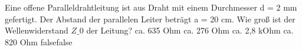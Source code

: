     {Eine offene Paralleldrahtleitung ist aus Draht mit einem Durchmesser d = 2 mm gefertigt. Der Abstand der parallelen Leiter beträgt a = 20 cm. Wie groß ist der Wellenwiderstand $Z\_0$ der Leitung?}
    {ca. 635 Ohm}
    {ca. 276 Ohm}
    {ca. 2,8 kOhm}
    {ca. 820 Ohm}
    {false}{false}